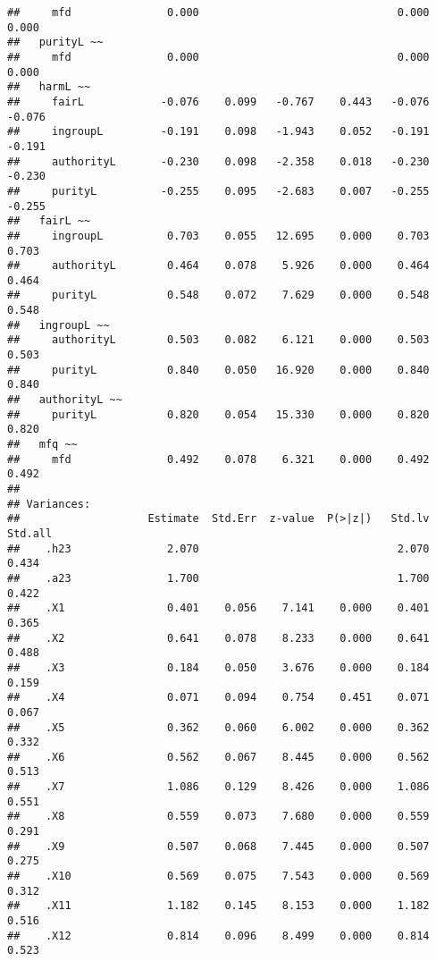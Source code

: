 \documentclass[english,man]{apa6}
\newcounter{author}
\theoremstyle{definition}
\theoremstyle{definition}
\theoremstyle{definition}
\theoremstyle{remark}
\begin{document}
\begin{verbatim}
##     mfd               0.000                               0.000    0.000
##   purityL ~~                                                            
##     mfd               0.000                               0.000    0.000
##   harmL ~~                                                              
##     fairL            -0.076    0.099   -0.767    0.443   -0.076   -0.076
##     ingroupL         -0.191    0.098   -1.943    0.052   -0.191   -0.191
##     authorityL       -0.230    0.098   -2.358    0.018   -0.230   -0.230
##     purityL          -0.255    0.095   -2.683    0.007   -0.255   -0.255
##   fairL ~~                                                              
##     ingroupL          0.703    0.055   12.695    0.000    0.703    0.703
##     authorityL        0.464    0.078    5.926    0.000    0.464    0.464
##     purityL           0.548    0.072    7.629    0.000    0.548    0.548
##   ingroupL ~~                                                           
##     authorityL        0.503    0.082    6.121    0.000    0.503    0.503
##     purityL           0.840    0.050   16.920    0.000    0.840    0.840
##   authorityL ~~                                                         
##     purityL           0.820    0.054   15.330    0.000    0.820    0.820
##   mfq ~~                                                                
##     mfd               0.492    0.078    6.321    0.000    0.492    0.492
## 
## Variances:
##                    Estimate  Std.Err  z-value  P(>|z|)   Std.lv  Std.all
##    .h23               2.070                               2.070    0.434
##    .a23               1.700                               1.700    0.422
##    .X1                0.401    0.056    7.141    0.000    0.401    0.365
##    .X2                0.641    0.078    8.233    0.000    0.641    0.488
##    .X3                0.184    0.050    3.676    0.000    0.184    0.159
##    .X4                0.071    0.094    0.754    0.451    0.071    0.067
##    .X5                0.362    0.060    6.002    0.000    0.362    0.332
##    .X6                0.562    0.067    8.445    0.000    0.562    0.513
##    .X7                1.086    0.129    8.426    0.000    1.086    0.551
##    .X8                0.559    0.073    7.680    0.000    0.559    0.291
##    .X9                0.507    0.068    7.445    0.000    0.507    0.275
##    .X10               0.569    0.075    7.543    0.000    0.569    0.312
##    .X11               1.182    0.145    8.153    0.000    1.182    0.516
##    .X12               0.814    0.096    8.499    0.000    0.814    0.523

\end{verbatim}
\end{document}
